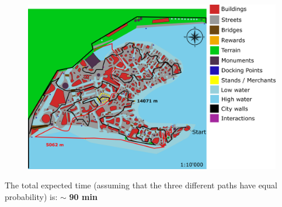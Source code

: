 \begin{itemize}
\begin{figure}[H]
    \centering
\includegraphics[scale=0.3]{Images/Diagrams/dynamiapath3.png}
\end{figure}
\end{itemize}


The total expected time (assuming that the three different paths have equal probability) is:  $\sim$ \textbf{90 min}


